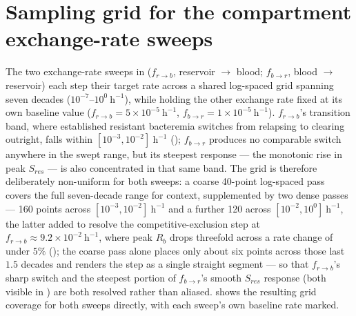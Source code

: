 \documentclass[11pt]{article}
\begin{document}
\section{Sampling grid for the compartment exchange-rate sweeps}
\label{sec:s5}

The two exchange-rate sweeps in 
($f_{r \to b}$, reservoir $\to$ blood; $f_{b \to r}$, blood $\to$ reservoir)
each step their target rate across a shared log-spaced grid spanning seven
decades ($10^{-7}$--$10^{0}~\mathrm{h}^{-1}$), while holding the other
exchange rate fixed at its own baseline value
($f_{r \to b} = 5\times10^{-5}~\mathrm{h}^{-1}$,
$f_{b \to r} = 1\times10^{-5}~\mathrm{h}^{-1}$). $f_{r \to b}$'s transition
band, where established resistant bacteremia switches from relapsing to
clearing outright, falls within $[10^{-3}, 10^{-2}]~\mathrm{h}^{-1}$
(); $f_{b \to r}$ produces no comparable switch anywhere in the
swept range, but its steepest response --- the monotonic rise in peak
$S_{res}$ --- is also concentrated in that same band. The grid is therefore
deliberately non-uniform for both sweeps: a coarse 40-point log-spaced pass
covers the full seven-decade range for context, supplemented by two dense
passes --- 160 points across $[10^{-3}, 10^{-2}]~\mathrm{h}^{-1}$ and a
further 120 across $[10^{-2}, 10^{0}]~\mathrm{h}^{-1}$, the latter added to
resolve the competitive-exclusion step at $f_{r \to b} \approx
9.2\times10^{-2}~\mathrm{h}^{-1}$, where peak $R_b$ drops threefold
across a rate change of under $5\%$ (); the coarse pass
alone places only about six points across those last $1.5$ decades and
renders the step as a single straight segment --- so that
$f_{r \to b}$'s sharp switch and the steepest portion of $f_{b \to r}$'s
smooth $S_{res}$ response (both visible in
) are both resolved rather
than aliased.
 shows the resulting grid coverage for both
sweeps directly, with each sweep's own baseline rate marked.
\end{document}
